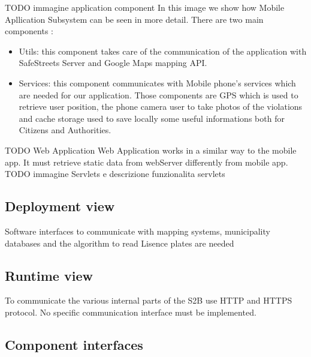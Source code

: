 TODO immagine application component
In this image we show how Mobile Apllication Subsystem can be seen in more detail.
There are two main components : 
\begin{itemize}
\item Utils:  this component takes care of the communication of the application with SafeStreets Server and Google Maps mapping API.
\item Services: this component communicates with Mobile phone's services which are needed for our application. Those components are GPS which is used to retrieve user position, the phone camera user to take photos of the violations and cache storage used to save locally some useful informations both for Citizens and Authorities.
\end{itemize}
TODO Web Application
Web Application works in a similar way to the mobile app. It must retrieve static data from webServer differently from mobile app.
TODO immagine Servlets e descrizione funzionalita servlets
\subsection{Deployment view}
Software interfaces to communicate with mapping systems, municipality databases and the algorithm to read Lisence plates are needed 
\subsection{Runtime view}
To communicate the various internal parts of the S2B use HTTP and HTTPS protocol. No specific communication interface must be implemented.
\subsection{Component interfaces}

